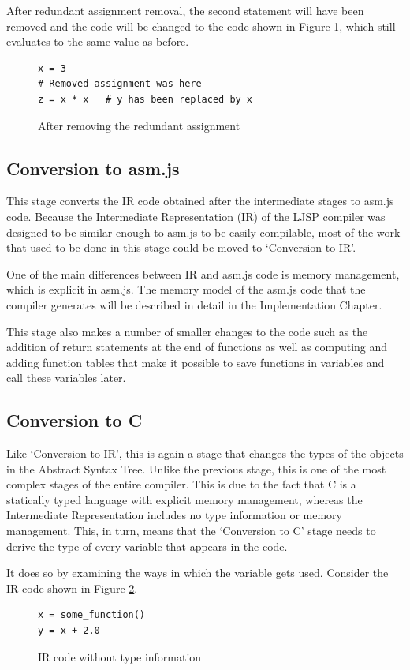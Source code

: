 \documentclass[11pt]{report}
\begin{document}
After redundant assignment removal, the second statement will have been removed and the code will be changed to the code shown in Figure \ref{redrem2}, which still evaluates to the same value as before.
\begin{figure}[ht]
\begin{lstlisting}
x = 3
# Removed assignment was here
z = x * x   # y has been replaced by x
\end{lstlisting}
\caption{After removing the redundant assignment}
\label{redrem2}
\end{figure}


\subsection{Conversion to asm.js}
This stage converts the IR code obtained after the intermediate stages to asm.js code. Because the Intermediate Representation (IR) of the LJSP compiler was designed to be similar enough to asm.js to be easily compilable, most of the work that used to be done in this stage could be moved to `Conversion to IR'.

One of the main differences between IR and asm.js code is memory management, which is explicit in asm.js. The memory model of the asm.js code that the compiler generates will be described in detail in the Implementation Chapter.

This stage also makes a number of smaller changes to the code such as the addition of return statements at the end of functions as well as computing and adding function tables that make it possible to save functions in variables and call these variables later.

\subsection{Conversion to C}
Like `Conversion to IR', this is again a stage that changes the types of the objects in the Abstract Syntax Tree. Unlike the previous stage, this is one of the most complex stages of the entire compiler. This is due to the fact that C is a statically typed language with explicit memory management, whereas the Intermediate Representation includes no type information or memory management. This, in turn, means that the `Conversion to C' stage needs to derive the type of every variable that appears in the code.

It does so by examining the ways in which the variable gets used. Consider the IR code shown in Figure \ref{convc1}.
\begin{figure}[ht]
\begin{lstlisting}
x = some_function()
y = x + 2.0
\end{lstlisting}
\caption{IR code without type information}
\label{convc1}
\end{figure}
\end{document}
